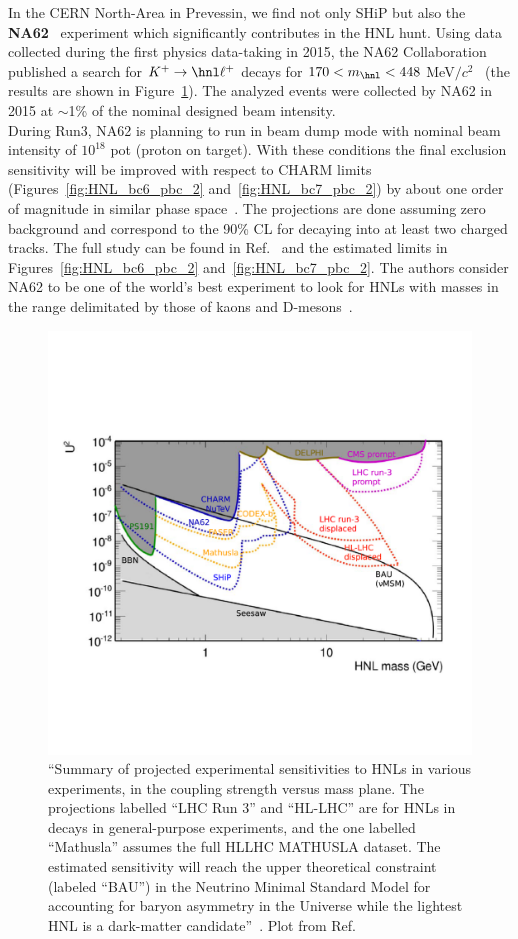 In the CERN North-Area in Prevessin, we find not only SHiP but also the
\textbf{NA62}~\cite{Gil_2017} experiment which significantly contributes in
the HNL hunt. Using data 
collected during the first physics data-taking in 2015, the NA62
Collaboration published a search for $K^{+} \rightarrow \hnl \ell^{+}$
decays for $170 <m_\hnl< 448$ MeV$/c^{2}$~\cite{Cortina_Gil_2018} (the
results are shown in Figure~\ref{fig:HL_alimena}). The analyzed events
were collected by NA62 in 2015 at $\sim$1\% of the nominal designed
beam intensity.\\
During Run3, NA62 is planning to run in beam dump mode with
nominal beam intensity of $10^{18}$ pot (proton on target). With these
conditions the final exclusion sensitivity will be improved with 
respect to CHARM limits (Figures~\ref{fig:HNL_bc6_pbc_2}
and~\ref{fig:HNL_bc7_pbc_2})
by about one order of magnitude in similar phase
space~\cite{na62Drewes_2018}.
The projections are done assuming zero background and 
correspond to the 90\% CL for \hnl decaying into at least two
 charged tracks. The full study can be found in
 Ref.~\cite{na62Drewes_2018} and the estimated limits in Figures~\ref{fig:HNL_bc6_pbc_2}
and~\ref{fig:HNL_bc7_pbc_2}. The authors consider NA62 to be one of
the world’s best experiment to look for HNLs with masses in the range
delimitated by those of kaons and D-mesons~\cite{na62Drewes_2018}.\\
\begin{figure}[h]
\centering
    \includegraphics[clip,trim=0.5cm 3.5cm 1.cm 4.3cm, width=.78\textwidth]{Figures/c7/projection_alimena.pdf}
\caption{``Summary of projected experimental sensitivities to HNLs in various
experiments, in the coupling strength \mixpar versus mass
plane. The projections labelled ``LHC Run 3'' and ``HL-LHC'' are for HNLs in \PW decays
in general-purpose experiments, and the one labelled ``Mathusla'' assumes the full HLLHC
MATHUSLA dataset. The estimated sensitivity will reach the upper theoretical
constraint (labeled ``BAU'') in the Neutrino Minimal Standard Model
for accounting for baryon asymmetry in the Universe
while the lightest HNL is a dark-matter
candidate''~\cite{PhysRevD.87.093006}. Plot from Ref.~\cite{Alimena_2020}}
\label{fig:HL_alimena}
\end{figure}

